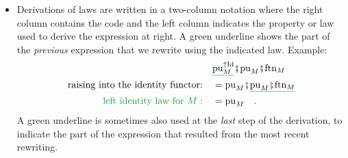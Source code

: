 \begin{itemize}
\item Derivations of laws are written in a two-column notation where the
right column contains the code and the left column indicates the property
or law used to derive the expression at right. A green underline shows
the part of the \emph{previous} expression that we rewrite using the
indicated law. Example: 
\begin{align*}
 & \gunderline{\text{pu}_{M}^{\uparrow\text{Id}}}\bef\text{pu}_{M}\bef\text{ftn}_{M}\\
\text{raising into the identity functor:}\quad & =\text{pu}_{M}\bef\gunderline{\text{pu}_{M}\bef\text{ftn}_{M}}\\
{\color{greenunder}\text{left identity law for }M:}\quad & =\text{pu}_{M}\quad.
\end{align*}
A green underline is sometimes also used at the \emph{last} step of
the derivation, to indicate the part of the expression that resulted
from the most recent rewriting.
\end{itemize}

